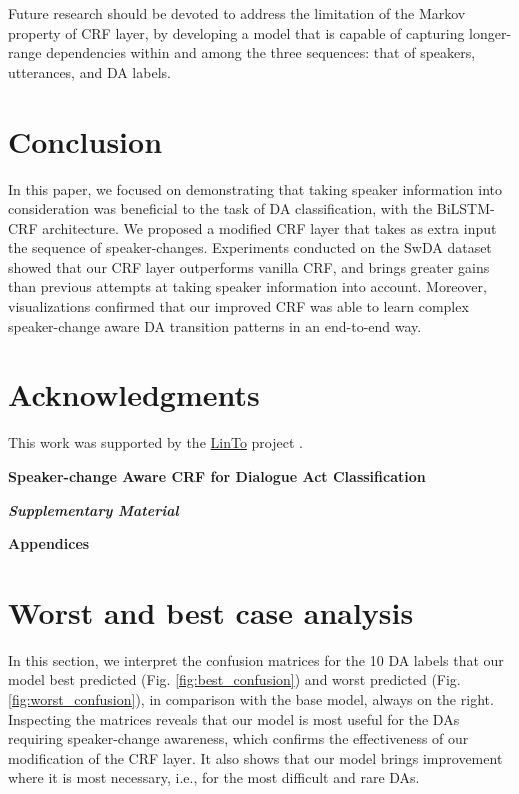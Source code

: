 \documentclass[11pt,a4paper]{article}
\begin{document}
Future research should be devoted to address the limitation of the Markov property of CRF layer, by developing a model that is capable of capturing longer-range dependencies within and among the three sequences: that of speakers, utterances, and DA labels.

\section{Conclusion}
In this paper, we focused on demonstrating that taking speaker information into consideration was beneficial to the task of DA classification, with the BiLSTM-CRF architecture.
We proposed a modified CRF layer that takes as extra input the sequence of speaker-changes. Experiments conducted on the SwDA dataset showed that our CRF layer outperforms vanilla CRF, and brings greater gains than previous attempts at taking speaker information into account.
Moreover, visualizations confirmed that our improved CRF was able to learn complex speaker-change aware DA transition patterns in an end-to-end way.

\section{Acknowledgments}
This work was supported by the \href{https://linto.ai}{LinTo} project \citep{lorre2019linto}.

\onecolumn

\begin{center}
\textbf{\Large Speaker-change Aware CRF for Dialogue Act Classification}
\vspace{0.2cm}

\textbf{\Large \textit{Supplementary Material}}
\vspace{0.6cm}
\end{center}

\noindent\textbf{\Large Appendices}

\appendix

\section{Worst and best case analysis}\label{app:case_analysis}
In this section, we interpret the confusion matrices for the 10 DA labels that our model best predicted (Fig. \ref{fig:best_confusion}) and worst predicted (Fig. \ref{fig:worst_confusion}), in comparison with the base model, always on the right.
Inspecting the matrices reveals that our model is most useful for the DAs requiring speaker-change awareness, which confirms the effectiveness of our modification of the CRF layer.
It also shows that our model brings improvement where it is most necessary, i.e., for the most difficult and rare DAs.\\
\end{document}
